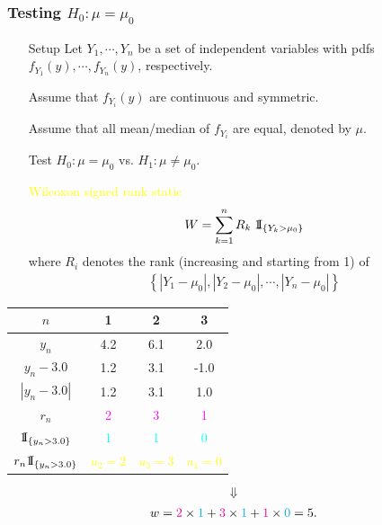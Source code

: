 \begin{frame}[fragile]
	\frametitle{Testing $H_0:\mu=\mu_0$}
\begin{itemize}
	\item[Setup] Let $Y_1,\cdots, Y_n$ be a set of independent variables with pdfs $f_{Y_1}(y),\cdots, f_{Y_n}(y)$, respectively.
	\item[] Assume that $f_{Y_i}(y)$ are continuous and symmetric.
	\item[] Assume that all mean/median of $f_{Y_i}$ are equal, denoted by $\mu$.
	\bigskip
	\item[Test] $H_0:\mu=\mu_0$ vs. $H_1:\mu\ne \mu_0$.
	\mySeparateLine
	\bigskip
	\item[] \textcolor{yellow}{Wilcoxon signed rank static}
	\begin{align*}
		W = \sum_{k=1}^n  R_k\; {{\rm 1\mkern-1.5mu}\!{\rm I}}_{\{Y_k>\mu_0\}}
	\end{align*}
	where $R_i$ denotes the rank (increasing and starting from 1) of
	\begin{align*}
		\left\{|Y_1-\mu_0|,|Y_2-\mu_0|,\cdots,|Y_n-\mu_0|\right\}
	\end{align*}
\end{itemize}
\end{frame}
\begin{frame}[fragile]
\begin{center}
	\renewcommand{\arraystretch}{1.5}
	\begin{tabular}{c|ccc}
		$n$                     & 1                           & 2                           & 3                           \\ \hline
		$y_n$                   & 4.2                         & 6.1                         & 2.0                         \\
    $y_n-3.0$               & 1.2                         & 3.1                         & -1.0                        \\
    $\left|y_n-3.0\right|$  & 1.2                         & 3.1                         & 1.0                         \\
		$r_n$                   & \textcolor{magenta}{2}      & \textcolor{magenta}{3}      & \textcolor{magenta}{1}      \\
		${{\rm 1\mkern-1.5mu}\!{\rm I}}_{\{y_n>3.0\}}$    & \textcolor{cyan}{1}         & \textcolor{cyan}{1}         & \textcolor{cyan}{0}         \\ [1em]
		$r_n{{\rm 1\mkern-1.5mu}\!{\rm I}}_{\{y_n>3.0\}}$ & \textcolor{yellow}{$u_2=2$} & \textcolor{yellow}{$u_3=3$} & \textcolor{yellow}{$u_1=0$} \\
	\end{tabular}
\end{center}
\bigskip
\[\Downarrow\]
\begin{align*}
	w= \textcolor{magenta}{2}\times \textcolor{cyan}{1} + \textcolor{magenta}{3} \times \textcolor{cyan}{1} + \textcolor{magenta}{1} \times \textcolor{cyan}{0} = 5.
\end{align*}
\end{frame}
